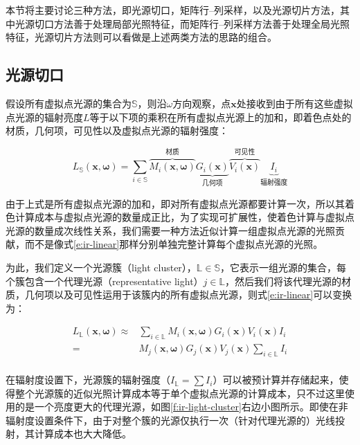 本节将主要讨论三种方法，即光源切口，矩阵行--列采样，以及光源切片方法，其中光源切口方法善于处理局部光照特征，而矩阵行--列采样方法善于处理全局光照特征，光源切片方法则可以看做是上述两类方法的思路的组合。





\subsection{光源切口}
假设所有虚拟点光源的集合为$\mathds{S}$，则沿$\omega$方向观察，点$\mathbf{x}$处接收到由于所有这些虚拟点光源的辐射亮度$L$等于以下项的乘积在所有虚拟点光源上的加和，即着色点处的材质，几何项，可见性以及虚拟点光源的辐射强度：

\begin{equation}\label{e:ir-linear}
	L_{\mathds{S}}(\mathbf{x},\mathbf{\omega})=\sum_{i\in\mathds{S}}\overbrace{M_i(\mathbf{x},\mathbf{\omega})}^{\text{材质}}\underbrace{G_i(\mathbf{x})}_{\text{几何项}}\overbrace{V_i(\mathbf{x})}^{\text{可见性}}\underbrace{I_i}_{\text{辐射强度}}
\end{equation}

\noindent 由于上式是所有虚拟点光源的加和，即对所有虚拟点光源都要计算一次，所以其着色计算成本与虚拟点光源的数量成正比，为了实现可扩展性，使着色计算与虚拟点光源的数量成次线性关系，我们需要一种方法近似计算一组虚拟点光源的光照贡献，而不是像式\ref{e:ir-linear}那样分别单独完整计算每个虚拟点光源的光照。

为此，我们定义一个光源簇（light cluster），$\mathds{L}\in\mathds{S}$，它表示一组光源的集合，每个簇包含一个代理光源（representative light）$j\in\mathds{L}$，然后我们将该代理光源的材质，几何项以及可见性运用于该簇内的所有虚拟点光源，则式\ref{e:ir-linear}可以变换为：

\begin{equation}\label{e:ir-sublinear}
\begin{aligned}
	L_{\mathds{L}}(\mathbf{x},\mathbf{\omega}) \approx & \sum_{i\in\mathds{L}}M_i(\mathbf{x},\mathbf{\omega})G_i(\mathbf{x})V_i(\mathbf{x})I_i\\
	= & M_j(\mathbf{x},\mathbf{\omega})G_j(\mathbf{x})V_j(\mathbf{x})\sum_{i\in\mathds{L}}I_i\\
\end{aligned}
\end{equation}

\noindent 在辐射度设置下，光源簇的辐射强度（$I_{\mathds{L}}=\sum I_i$）可以被预计算并存储起来，使得整个光源簇的近似光照计算成本等于单个虚拟点光源的计算成本，只不过这里使用的是一个亮度更大的代理光源，如图\ref{f:ir-light-cluster}右边小图所示。即使在非辐射度设置条件下，由于对整个簇的光源仅执行一次（针对代理光源的）光线投射，其计算成本也大大降低。

